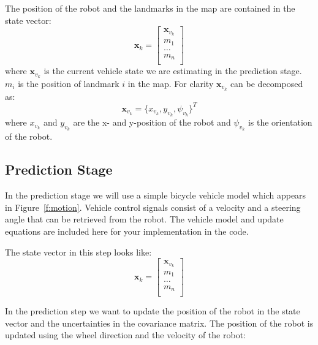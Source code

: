 \documentclass[a4, 10pt]{article}
\begin{document}
The position of the robot and the landmarks in the map are contained
in the state vector:
\begin{equation}
\mathbf{x}_{k} = \left[  \begin{array}{c}
\mathbf{x}_{v_k}\\
m_{1} \\
\dots\\
m_{n}\\
\end{array}
\right]
\end{equation}
where $\mathbf{x}_{v_k}$ is the current vehicle state we are
estimating in the prediction stage. $m_i$ is the position of landmark
$i$ in the map. For clarity $\mathbf{x}_{v_{k}}$  can be decomposed as: 
\begin{equation}
\mathbf{x}_{v_{k}} = \{x_{v_{k}},y_{v_{k}} ,\psi_{v_{k}} \}^T
\end{equation}
where $x_{v_{k}}$ and $y_{v_{k}}$ are the x- and y-position of the
robot and $\psi_{v_{k}}$ is the orientation of the robot.

\subsection{Prediction Stage}
In the prediction stage we will use a simple bicycle vehicle model which appears in Figure~\ref{f:motion}. Vehicle control signals consist of a velocity and  a steering angle that can be retrieved from the robot. The vehicle model and update equations are included here for your implementation in the code.

The state vector in this step looks like:
\begin{equation}
\mathbf{x}_{k} = \left[  \begin{array}{c}
\mathbf{x}_{v_k}\\
m_{1} \\
\dots\\
m_{n}\\
\end{array}
\right]
\end{equation}

In the prediction step we want to update the position of the robot in
the state vector and the uncertainties in the covariance matrix. The
position of the robot is updated using the wheel direction and the
velocity of the robot:
\end{document}
